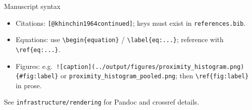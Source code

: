 \documentclass[
  ignorenonframetext,
]{beamer}
\author{\texorpdfstring{}{}}
\date{}
\providecommand{\tightlist}{%
  \setlength{\itemsep}{0pt}\setlength{\parskip}{0pt}}
\begin{document}
\begin{frame}[fragile]{Manuscript syntax}
\protect{}\label{manuscript-syntax}
\begin{itemize}
\tightlist
\item
  Citations: \texttt{{[}@khinchin1964continued{]}}; keys must exist in
  \texttt{references.bib}.
\item
  Equations: use \texttt{\textbackslash{}begin\{equation\}} /
  \texttt{\textbackslash{}label\{eq:...\}}; reference with
  \texttt{\textbackslash{}ref\{eq:...\}}.
\item
  Figures:
  e.g.~\texttt{!{[}caption{]}(../output/figures/proximity\_histogram.png)\{\#fig:label\}}
  or \texttt{proximity\_histogram\_pooled.png}; then
  \texttt{\textbackslash{}ref\{fig:label\}} in prose.
\end{itemize}

See \texttt{infrastructure/rendering} for Pandoc and crossref details.
\end{frame}
\end{document}
